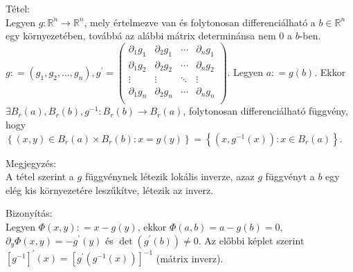 \documentclass[12pt,a4paper]{scrartcl}
\newenvironment{tetel}{}{}
\newenvironment{bizonyitas}{}{}
\newenvironment{megjegyzes}{}{}
\begin{document}
\begin{tetel}

Tétel:\\
Legyen \(\left. g:{\mathbb{R}}^{n}\rightarrow{\mathbb{R}}^{n} \right.\),
mely értelmezve van és folytonosan differenciálható a
\(b \in {\mathbb{R}}^{n}\) egy környezetében, továbbá az alábbi mátrix
determinánsa nem 0 a \(b\)-ben.
\(g: = \left( {g_{1},g_{2},...,g_{n}} \right),g^{\prime} = \begin{pmatrix} {\partial_{1}g_{1}} & {\partial_{2}g_{1}} & \cdots & {\partial_{n}g_{1}} \\ {\partial_{1}g_{2}} & {\partial_{2}g_{2}} & \cdots & {\partial_{n}g_{2}} \\  \vdots & \vdots & \ddots & \vdots \\ {\partial_{1}g_{n}} & {\partial_{2}g_{n}} & \cdots & {\partial_{n}g_{n}} \\ \end{pmatrix}\).
Legyen \(a: = g\left( b \right)\). Ekkor
\(\left. \exists B_{r}\left( a \right),B_{r}\left( b \right),g^{- 1}:B_{r}\left( b \right)\rightarrow B_{r}\left( a \right) \right.\),
folytonosan differenciálható függvény, hogy
\(\left\{ {\left( {x,y} \right) \in B_{r}\left( a \right) \times B_{r}\left( b \right):x = g\left( y \right)} \right\} = \left\{ {\left( {x,g^{- 1}\left( x \right)} \right):x \in B_{r}\left( a \right)} \right\}\).

\end{tetel}

\begin{megjegyzes}

Megjegyzés:\\
A tétel szerint a \(g\) függvénynek létezik lokális inverze, azaz \(g\)
függvényt a \(b\) egy elég kis környezetére leszűkítve, létezik az
inverz.

\end{megjegyzes}

\begin{bizonyitas}

Bizonyítás:\\
Legyen \(\Phi\left( {x,y} \right): = x - g\left( y \right)\), ekkor
\(\Phi\left( {a,b} \right) = a - g\left( b \right) = 0\),
\(\partial_{y}\Phi\left( {x,y} \right) = - g^{\prime}\left( y \right)\)
és \(\det\left( {g^{\prime}\left( b \right)} \right) \neq 0\). Az előbbi
képlet szerint
\(\left\lbrack g^{- 1} \right\rbrack^{\prime}\left( x \right) = \left\lbrack {g^{\prime}\left( {g^{- 1}\left( x \right)} \right)} \right\rbrack^{- 1}\)
(mátrix inverz).

\end{bizonyitas}
\end{document}
